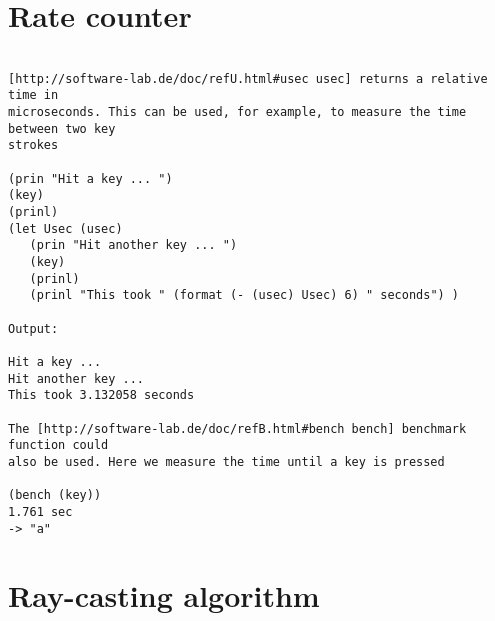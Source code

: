 \section*{Rate counter}

\begin{verbatim}

[http://software-lab.de/doc/refU.html#usec usec] returns a relative time in
microseconds. This can be used, for example, to measure the time between two key
strokes

(prin "Hit a key ... ")
(key)
(prinl)
(let Usec (usec)
   (prin "Hit another key ... ")
   (key)
   (prinl)
   (prinl "This took " (format (- (usec) Usec) 6) " seconds") )

Output:

Hit a key ...
Hit another key ...
This took 3.132058 seconds

The [http://software-lab.de/doc/refB.html#bench bench] benchmark function could
also be used. Here we measure the time until a key is pressed

(bench (key))
1.761 sec
-> "a"

\end{verbatim}

\section*{Ray-casting algorithm}

